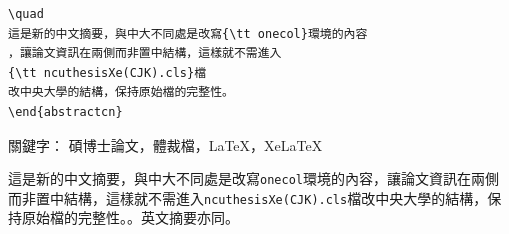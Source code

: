 \begin{appendB}
\begin{Verbatim}[frame=single,firstline=1,lastline=50,rulecolor=\color{red},label=New abstract]
\quad
這是新的中文摘要，與中大不同處是改寫{\tt onecol}環境的內容
，讓論文資訊在兩側而非置中結構，這樣就不需進入
{\tt ncuthesisXe(CJK).cls}檔
改中央大學的結構，保持原始檔的完整性。
\end{abstractcn}
\end{Verbatim}      




\makeatletter
\renewenvironment{onecol}[1]
{\cleardoublepage\phantomsection
\addcontentsline{toc}{subsection}{#1} %
\begin{alwayssingle}
\thispagestyle{plain}
\begin{center}
{\Huge \bfseries #1}
\end{center}
\setlength{\parindent}{0pt}
{\Large 論文名稱：\@title \hfill 頁數：101 頁
\par \vspace*{1ex}}
{\Large 校所系別：\@dept \par \vspace*{1ex}}
{\Large 畢業日期：\@degreedate \hfill 學位：\@degree \par \vspace*{1ex}}
{\Large 研究生：\@author \hfill 指導教授：\@mprof \par \vspace*{2ex}}
}
{\null \vfill
\end{alwayssingle}}
\makeatother

\begin{abstractcn}
關鍵字： 碩博士論文，體裁檔，\LaTeX{}，Xe\LaTeX{}
\vspace{2ex}

\quad

這是新的中文摘要，與中大不同處是改寫{\tt onecol}環境的內容，讓論文資訊在兩側而非置中結構，這樣就不需進入{\tt ncuthesisXe(CJK).cls}檔改中央大學的結構，保持原始檔的完整性。。英文摘要亦同。


\end{abstractcn}
\end{appendB}
